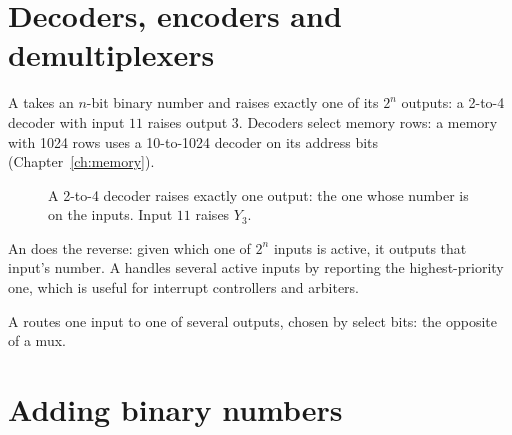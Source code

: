 \section{Decoders, encoders and demultiplexers}

A  takes an $n$-bit binary number and raises exactly one of its $2^n$ outputs: a 2-to-4 decoder with input $11$ raises output 3. Decoders select memory rows: a memory with 1024 rows uses a 10-to-1024 decoder on its address bits (Chapter~\ref{ch:memory}).

\begin{figure}[h]
\centering
{}
\caption{A 2-to-4 decoder raises exactly one output: the one whose number is on the inputs. Input $11$ raises $Y_3$.}
\label{fig:decoder}
\end{figure}

An  does the reverse: given which one of $2^n$ inputs is active, it outputs that input's number. A  handles several active inputs by reporting the highest-priority one, which is useful for interrupt controllers and arbiters.

A  routes one input to one of several outputs, chosen by select bits: the opposite of a mux.

\section{Adding binary numbers}

